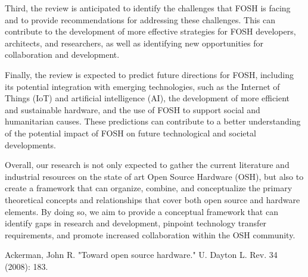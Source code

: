 \documentclass[conference]{IEEEtran}
\begin{document}
Third, the review is anticipated to identify the challenges that FOSH is facing and to provide recommendations for addressing these challenges. This can contribute to the development of more effective strategies for FOSH developers, architects, and researchers, as well as identifying new opportunities for collaboration and development.

Finally, the review is expected to predict future directions for FOSH, including its potential integration with emerging technologies, such as the Internet of Things (IoT) and artificial intelligence (AI), the development of more efficient and sustainable hardware, and the use of FOSH to support social and humanitarian causes. These predictions can contribute to a better understanding of the potential impact of FOSH on future technological and societal developments.

Overall, our research is not only expected to gather the current literature and industrial resources on the state of art Open Source Hardware (OSH), but also to create a framework that can organize, combine, and conceptualize the primary theoretical concepts and relationships that cover both open source and hardware elements\cite{b1}. By doing so, we aim to provide a conceptual framework that can identify gaps in research and development, pinpoint technology transfer requirements, and promote increased collaboration within the OSH community.


\begin{thebibliography}{00}
 Ackerman, John R. "Toward open source hardware." U. Dayton L. Rev. 34 (2008): 183.
\end{thebibliography}

\vspace{12pt}
\end{document}
